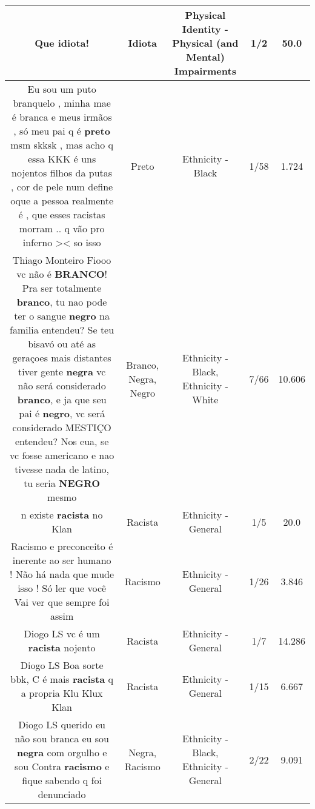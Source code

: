 \documentclass[11pt]{article}
\newlength\mylength
\begin{document}
\begin{center}
\begin{longtable}{|C{.65\mylength}|C{.30\mylength}|C{.12\mylength}|C{.12\mylength}|C{.12\mylength}|}
  \small Que \textbf{idiota}!\normalsize   & Idiota & Physical Identity - Physical (and Mental) Impairments & 1/2 & 50.0 \\  \hline
  \small Eu sou um puto branquelo , minha mae é branca e meus irmãos , só meu pai q é \textbf{preto} msm skksk , mas acho q essa KKK é uns nojentos filhos da putas , cor de pele num define oque a pessoa realmente é , que esses racistas morram .. q vão pro inferno >< so isso\normalsize   & Preto & Ethnicity - Black & 1/58 & 1.724 \\  \hline
  \small Thiago Monteiro Fiooo vc não é \textbf{BRANCO}! Pra ser totalmente \textbf{branco}, tu nao pode ter o sangue \textbf{negro} na familia entendeu? Se teu bisavó ou até as geraçoes mais distantes tiver gente \textbf{negra} vc não será considerado \textbf{branco}, e ja que seu pai é \textbf{negro}, vc será considerado MESTIÇO entendeu? Nos eua, se vc fosse americano e nao tivesse nada de latino, tu seria \textbf{NEGRO} mesmo\normalsize   & Branco, Negra, Negro & Ethnicity - Black, Ethnicity - White & 7/66 & 10.606 \\  \hline
  \small n existe \textbf{racista} no Klan\normalsize   & Racista & Ethnicity - General & 1/5 & 20.0 \\  \hline
  \small Racismo e preconceito é inerente ao ser humano ! Não há nada que mude isso ! Só ler que você  Vai ver que sempre foi assim\normalsize   & Racismo & Ethnicity - General & 1/26 & 3.846 \\  \hline
  \small Diogo LS vc é um \textbf{racista} nojento\normalsize   & Racista & Ethnicity - General & 1/7 & 14.286 \\  \hline
  \small Diogo LS Boa sorte bbk, C é mais \textbf{racista} q a propria Klu Klux Klan\normalsize   & Racista & Ethnicity - General & 1/15 & 6.667 \\  \hline
  \small Diogo LS querido eu não sou branca eu sou \textbf{negra} com orgulho e sou Contra \textbf{racismo} e fique sabendo q foi denunciado\normalsize   & Negra, Racismo & Ethnicity - Black, Ethnicity - General & 2/22 & 9.091 \\  \hline

\end{longtable}
\end{center}
\end{document}
